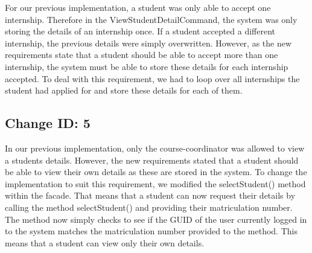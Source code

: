 \documentclass{l3deliverable}
\begin{document}
For our previous implementation, a student was only able to accept one internship. Therefore in the ViewStudentDetailCommand, the system was only storing the details of an internship once. If a student accepted a different internship, the previous details were simply overwritten. However, as the new requirements state that a student should be able to accept more than one internship, the system must be able to store these details for each internship accepted. 
To deal with this requirement, we had to loop over all internships the student had applied for and store these details for each of them.\\

\subsection{Change ID: 5}

In our previous implementation, only the course-coordinator was allowed to view a students details. However, the new requirements stated that a student should be able to view their own details as these are stored in the system. To change the implementation to suit this requirement, we modified the selectStudent() method within the facade. That means that a student can now request their details by calling the method selectStudent() and providing their matriculation number. The method now simply checks to see if the GUID of the user currently logged in to the system matches the matriculation number provided to the method. This means that a student can view only their own details.\\
\end{document}
